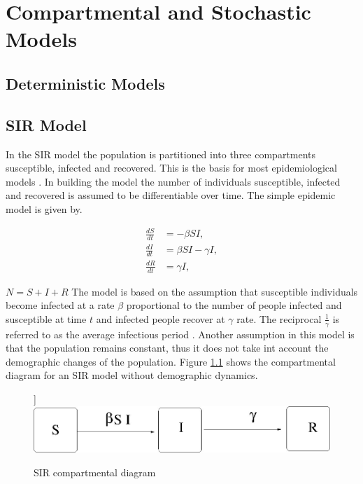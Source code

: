 \chapter{Compartmental and Stochastic Models}
\section{Deterministic Models}

\section{SIR Model}

In the SIR model the population is partitioned into three compartments susceptible, infected and recovered. This is the basis for most epidemiological models \citep{m1925applications}. In building the model the number of individuals susceptible, infected and recovered is assumed to be differentiable over time.
The simple epidemic model is given by.
\begin{center}
\begin{align} \label{eqn4.1}
\frac{dS}{dt} &= -\beta SI,\\
 \frac{dI}{dt} &=\beta S I - \gamma  I, \\
 \frac{dR}{dt} &= \gamma  I,
\end{align}
\end{center}

$N = S + I + R$
The model is based on the assumption that susceptible individuals become infected at a rate $\beta$ proportional to the number of people infected and susceptible at time $t$ and infected people recover at $\gamma$ rate. The reciprocal $\frac{1}{\gamma}$ is referred to as the average infectious period . Another assumption in this model is that the population remains constant, thus it does not take int account the demographic changes of the population. Figure \ref{fig 4.1} shows the compartmental diagram for an SIR model without demographic dynamics.
\begin{figure}[h!]
\caption{SIR compartmental diagram}]\label{fig 4.1}
\centering
\includegraphics[scale=0.5]{images/sir.jpg} 
\end{figure}



